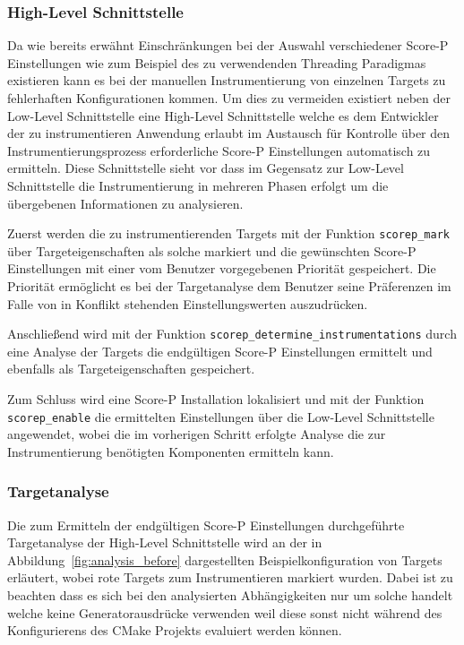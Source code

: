 \documentclass[german,proseminar,hyperref,utf8,lof]{zihpub}
\begin{document}
    \subsubsection{High-Level Schnittstelle}
    Da wie bereits erwähnt Einschränkungen bei der Auswahl verschiedener Score-P Einstellungen wie zum
    Beispiel des zu verwendenden Threading Paradigmas existieren kann es bei der manuellen Instrumentierung
    von einzelnen Targets zu fehlerhaften Konfigurationen kommen.
    Um dies zu vermeiden existiert neben der Low-Level Schnittstelle eine High-Level Schnittstelle
    welche es dem Entwickler der zu instrumentieren Anwendung erlaubt im Austausch für Kontrolle
    über den Instrumentierungsprozess erforderliche Score-P Einstellungen automatisch zu ermitteln.
    Diese Schnittstelle sieht vor dass im Gegensatz zur Low-Level Schnittstelle die Instrumentierung
    in mehreren Phasen erfolgt um die übergebenen Informationen zu analysieren.

    Zuerst werden die zu instrumentierenden Targets mit der Funktion \texttt{scorep\_mark} über Targeteigenschaften
    als solche markiert und die gewünschten Score-P Einstellungen mit einer vom Benutzer vorgegebenen
    Priorität gespeichert.
    Die Priorität ermöglicht es bei der Targetanalyse dem Benutzer seine Präferenzen im Falle von
    in Konflikt stehenden Einstellungswerten auszudrücken.

    Anschlie{\ss}end wird mit der Funktion \texttt{scorep\_determine\_instrumentations} durch eine Analyse der Targets
    die endgültigen Score-P Einstellungen ermittelt und ebenfalls als Targeteigenschaften gespeichert.

    Zum Schluss wird eine Score-P Installation lokalisiert und mit der Funktion \texttt{scorep\_enable}
    die ermittelten Einstellungen über die Low-Level Schnittstelle angewendet, wobei die im vorherigen
    Schritt erfolgte Analyse die zur Instrumentierung benötigten Komponenten ermitteln kann.

    \subsubsection{Targetanalyse}
    Die zum Ermitteln der endgültigen Score-P Einstellungen durchgeführte Targetanalyse der High-Level
    Schnittstelle wird an der in Abbildung~\ref{fig:analysis_before} dargestellten Beispielkonfiguration
    von Targets erläutert, wobei rote Targets zum Instrumentieren markiert wurden.
    Dabei ist zu beachten dass es sich bei den analysierten Abhängigkeiten nur um solche handelt
    welche keine Generatorausdrücke verwenden weil diese sonst nicht während des Konfigurierens
    des CMake Projekts evaluiert werden können.
\end{document}

